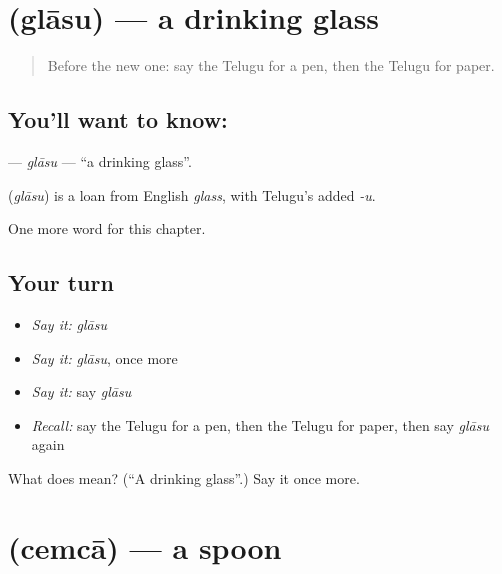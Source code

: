 \section[\texorpdfstring{\te{గ్లాసు} (glāsu)}{గ్లాసు (glāsu)}]{ (glāsu) — a drinking glass}

\label{lesson:TE-C112-glasu}



\begin{quote}
Before the new one: say the Telugu for a pen, then the Telugu for paper.
\end{quote}

\subsection*{You'll want to know: }
\textbf{} — \emph{glāsu} — \textquotedblleft{}a drinking glass\textquotedblright{}.

\begin{cousinweb}
\textbf{} (\emph{glāsu}) is a loan from English \emph{glass}, with Telugu's added \emph{-u}.
\end{cousinweb}

\begin{grammarlens}[title={What you've built}]
One more word for this chapter.
\end{grammarlens}

\subsection*{Your turn}
\begin{itemize}
\raggedright
  \item \emph{Say it:} \emph{glāsu}
  \item \emph{Say it:} \emph{glāsu}, once more
  \item \emph{Say it:} say \emph{glāsu}
  \item \emph{Recall:} say the Telugu for a pen, then the Telugu for paper, then say \emph{glāsu} again
\end{itemize}

\begin{tcolorbox}[breakable,colback=teal!4,colframe=teal!35!black,title={Before you move on}]
What does  mean? (\textquotedblleft{}A drinking glass\textquotedblright{}.) Say it once more.
\end{tcolorbox}
\section[\texorpdfstring{\te{చెంచా} (cemcā)}{చెంచా (cemcā)}]{ (cemcā) — a spoon}

